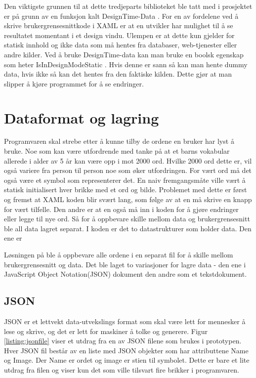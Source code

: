 Den viktigste grunnen til at dette tredjeparts biblioteket ble tatt med i prosjektet er på grunn av en funksjon kalt DesignTime-Data \cite{MVVMLightDoc:online}. For en av fordelene ved å skrive brukergrensesnittkode i XAML er at en utvikler har mulighet til å se resultatet momentant i et design vindu. Ulempen er at dette kun gjelder for statisk innhold og ikke data som må hentes fra databaser, web-tjenester eller andre kilder. Ved å bruke DesignTime-data kan man bruke en boolsk egenskap som heter IsInDesignModeStatic \cite{MVVM100123:online}. Hvis denne er sann så kan man hente dummy data, hvis ikke så kan det hentes fra den faktiske kilden. Dette gjør at man slipper å kjøre programmet for å se endringer.


\section{Dataformat og lagring}


Programvaren skal strebe etter å kunne tilby de ordene en bruker har lyst å bruke. Noe som kan være utfordrende med tanke på at et barns vokabular allerede i alder av 5 år kan være opp i mot 2000 ord. Hvilke 2000 ord dette er, vil også variere fra person til person noe som øker utfordringen. For vært ord må det også være et symbol som representerer det. En naiv fremgangsmåte ville vært å statisk initialisert hver brikke med et ord og bilde. Problemet med dette er først og fremst at XAML koden blir svært lang, som følge av at en må skrive en knapp for vært tilfelle. Den andre er at en også må inn i koden for å gjøre endringer eller legge til nye ord. Så for å oppbevare skille mellom data og brukergrensesnitt ble all data lagret separat. I koden er det to datastrukturer som holder data. Den ene er 

Løsningen på ble å oppbevare alle ordene i en separat fil for å skille mellom brukergrensesnitt og data. Det ble laget to variasjoner for lagre data - den ene i JavaScript Object Notation(JSON) dokument den andre som et tekstdokument.

\subsection{JSON}

JSON er et lettvekt data-utvekslings format som skal være lett for mennesker å lese og skrive, og det er lett for maskiner å tolke og generere\cite{JSON7:online}. Figur \ref{listing:jsonfile} viser et utdrag fra en av JSON filene som brukes i prototypen. Hver JSON fil består av en liste med JSON objekter som har attributtene Name og Image. Der Name er ordet og image er stien til symbolet. Dette er bare et lite utdrag fra filen og viser kun det som ville tilsvart fire brikker i programvaren.

